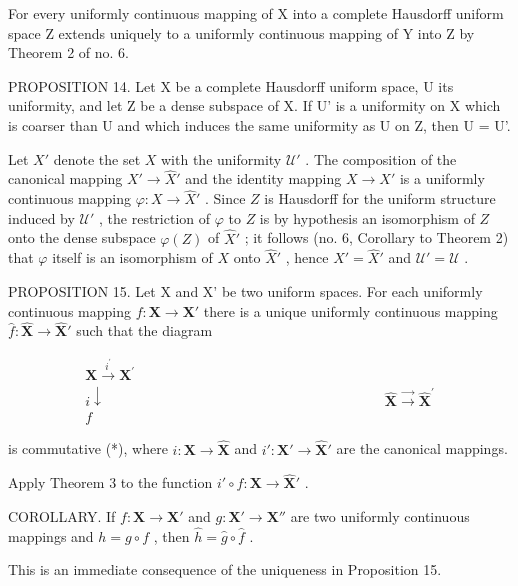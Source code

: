For every uniformly continuous mapping of X into a complete Hausdorff uniform space Z extends uniquely to a uniformly continuous mapping of Y into Z by Theorem 2 of no. 6.

PROPOSITION 14. Let X be a complete Hausdorff uniform space, U its uniformity, and let Z be a dense subspace of X. If U' is a uniformity on X which is coarser than U and which induces the same uniformity as U on Z, then U = U'.

Let \(X'\) denote the set \(X\) with the uniformity \(\mathcal{U}'\) . The composition of the canonical mapping \(X' \to \hat{X}'\) and the identity mapping \(X \to X'\) is a uniformly continuous mapping \(\varphi: X \to \hat{X}'\) . Since \(Z\) is Hausdorff for the uniform structure induced by \(\mathcal{U}'\) , the restriction of \(\varphi\) to \(Z\) is by hypothesis an isomorphism of \(Z\) onto the dense subspace \(\varphi(Z)\) of \(\hat{X}'\) ; it follows (no. 6, Corollary to Theorem 2) that \(\varphi\) itself is an isomorphism of \(X\) onto \(\hat{X}'\) , hence \(X' = \hat{X}'\) and \(\mathcal{U}' = \mathcal{U}\) .

PROPOSITION 15. Let X and X' be two uniform spaces. For each uniformly continuous mapping \(f: \mathbf{X} \to \mathbf{X}'\) there is a unique uniformly continuous mapping \(\hat{f}: \hat{\mathbf{X}} \to \hat{\mathbf{X}}'\) such that the diagram

\[
\begin{array}{c}\mathbf {X} \stackrel {{i ^ {\prime}}} {{\to}} \mathbf {X} ^ {\prime}\\i \downarrow \quad \quad \quad \quad \quad \quad \quad \quad \quad \quad \quad \quad \quad \quad \quad \quad \quad \quad \quad \quad \hat {\mathbf {X}} \stackrel {{\rightarrow}} {{\longrightarrow}} \hat {\mathbf {X}} ^ {\prime}\\f\end{array}
\]

is commutative (*), where \(i: \mathbf{X} \to \hat{\mathbf{X}}\) and \(i': \mathbf{X}' \to \hat{\mathbf{X}}'\) are the canonical mappings.

Apply Theorem 3 to the function \(i' \circ f: \mathbf{X} \to \hat{\mathbf{X}}'\) .

COROLLARY. If \(f: \mathbf{X} \to \mathbf{X}'\) and \(g: \mathbf{X}' \to \mathbf{X}''\) are two uniformly continuous mappings and \(h = g \circ f\) , then \(\hat{h} = \hat{g} \circ \hat{f}\) .

This is an immediate consequence of the uniqueness in Proposition 15.


